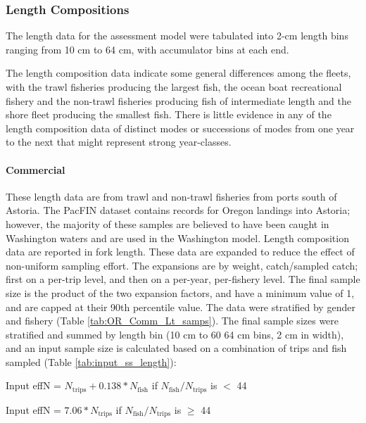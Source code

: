 \documentclass[11pt,
  letterpaper,
]{article}
\begin{document}
\hypertarget{length-compositions}{%
\subsubsection{Length Compositions}\label{length-compositions}}

The length data for the assessment model were tabulated into 2-cm length bins ranging from 10 cm to 64 cm, with accumulator bins at each end.

The length composition data indicate some general differences among the fleets, with the trawl fisheries producing the largest fish, the ocean boat recreational fishery and the non-trawl fisheries producing fish of intermediate length and the shore fleet producing the smallest fish. There is little evidence in any of the length composition data of distinct modes or successions of modes from one year to the next that might represent strong year-classes.

\hypertarget{commercial}{%
\paragraph{Commercial}\label{commercial}}

These length data are from trawl and non-trawl fisheries from ports south of Astoria. The PacFIN dataset contains records for Oregon landings into Astoria; however, the majority of these samples are believed to have been caught in Washington waters and are used in the Washington model. Length composition data are reported in fork length. These data are expanded to reduce the effect of non-uniform sampling effort. The expansions are by weight, catch/sampled catch; first on a per-trip level, and then on a per-year, per-fishery level. The final sample size is the product of the two expansion factors, and have a minimum value of 1, and are capped at their 90th percentile value. The data were stratified by gender and fishery (Table \ref{tab:OR_Comm_Lt_samps}). The final sample sizes were stratified and summed by length bin (10 cm to 60 64 cm bins, 2 cm in width), and an input sample size is calculated based on a combination of trips and fish sampled (Table \ref{tab:input_ss_length}):

\begin{centering}

Input effN = $N_{\text{trips}} + 0.138 * N_{\text{fish}}$ if $N_{\text{fish}}/N_{\text{trips}}$ is $<$ 44

Input effN = $7.06 * N_{\text{trips}}$ if $N_{\text{fish}}/N_{\text{trips}}$ is $\geq$ 44

\end{centering}
\end{document}
